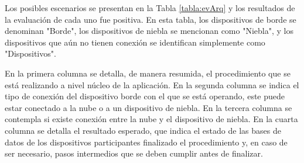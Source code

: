 Los posibles escenarios se presentan en la Tabla \ref{tabla:evArq} y los resultados de la evaluación de cada uno fue positiva. En esta tabla, los dispositivos de borde se denominan "Borde", los dispositivos de niebla se mencionan como "Niebla", y los dispositivos que aún no tienen conexión se identifican simplemente como "Dispositivos".

En la primera columna se detalla, de manera resumida, el procedimiento que se está realizando a nivel núcleo de la aplicación. En la segunda columna se indica el tipo de conexión del dispositivo borde con el que se está operando, este puede estar conectado a la nube o a un dispositivo de niebla. En la tercera columna se contempla si existe conexión entre la nube y el dispositivo de niebla. En la cuarta columna se detalla el resultado esperado, que indica el estado de las bases de datos de los dispositivos participantes finalizado el procedimiento y, en caso de ser necesario, pasos intermedios que se deben cumplir antes de finalizar.


